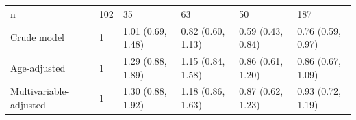 \documentclass[]{tufte-handout}
\begin{document}
\begin{table}[!h]
\begin{tabular}[t]{llllll}
\rowcolor{gray!6}  \hspace{1em}n & 102 & 35 & 63 & 50 & 187\\
\hspace{1em}Crude model & 1 & 1.01 (0.69, 1.48) & 0.82 (0.60, 1.13) & 0.59 (0.43, 0.84) & 0.76 (0.59, 0.97)\\
\rowcolor{gray!6}  \hspace{1em}Age-adjusted & 1 & 1.29 (0.88, 1.89) & 1.15 (0.84, 1.58) & 0.86 (0.61, 1.20) & 0.86 (0.67, 1.09)\\
\hspace{1em}Multivariable-adjusted & 1 & 1.30 (0.88, 1.92) & 1.18 (0.86, 1.63) & 0.87 (0.62, 1.23) & 0.93 (0.72, 1.19)\\
\bottomrule
\end{tabular}
\end{table}


\end{document}
